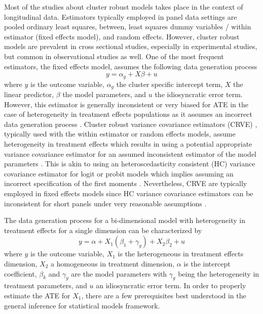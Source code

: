 \documentclass{jbsc}
\begin{document}
Most of the studies about cluster robust models takes place in the context of longitudinal data. Estimators typically employed in panel data settings are pooled ordinary least squares, between, least squares dummy variables / within estimator (fixed effects model), and random effects. However, cluster robust models are prevalent in cross sectional studies, especially in experimental studies, but common in observational studies as well. One of the most frequent estimators, the fixed effects model, assumes the following data generation process
\begin{equation}
y = \alpha_{g} + X \beta + u
\end{equation}
where $y$ is the outcome variable, $\alpha_{g}$ the cluster specific intercept term, $X$ the linear predictor, $\beta$ the model parameters, and $u$ the idiosyncratic error term. However, this estimator is generally inconsistent or very biased for ATE in the case of heterogeneity in treatment effects populations as it assumes an incorrect data generation process \citep{Gibbons_SúarezSerrato_Urbancic_2018}. Cluster robust variance covariance estimators (CRVE) \citep{Liang_Zeger_1986, Arellano_1987, Rogers_1993, Cameron_Gelbach_Miller_2011}, typically used with the within estimator or random effects models,  assume heterogeneity in treatment effects which results in using a potential appropriate variance covariance estimator for an assumed inconsistent estimator of the model parameters \citep{Abadie_Athey_Imbens_Wooldridge_2017}. This is akin to using an heteroscedasticity consistent (HC) variance covariance estimator \citep{Eicker_1967, Huber_1967, White_1980, MacKinnon_White_1985} for logit or probit models which implies assuming an incorrect specification of the first moments \citep{Wooldridge_2010}. Nevertheless, CRVE are typically employed in fixed effects models since HC variance covariance estimators can be inconsistent for short panels under very reasonable assumptions \citep{Stock_Watson_2008}.

The data generation process for a bi-dimensional model with heterogeneity in treatment effects for a single dimension can be characterized by
\begin{equation}
\label{basic_dgp}
y = \alpha + X_{1} \left(\beta_{1} + \gamma_{g}\right) + X_{2} \beta_{2} + u
\end{equation}
where $y$ is the outcome variable, $X_{1}$ is the heterogeneous in treatment effects dimension, $X_{2}$ a homogeneous in treatment dimension, $\alpha$ is the intercept coefficient, $\beta_{k}$  and $\gamma_{g}$ are the model parameters with $\gamma_{g}$ being the heterogeneity in treatment parameters, and $u$ an idiosyncratic error term. In order to properly estimate the ATE for $X_{1}$, there are a few prerequisites best understood in the general inference for statistical models framework.
\end{document}

